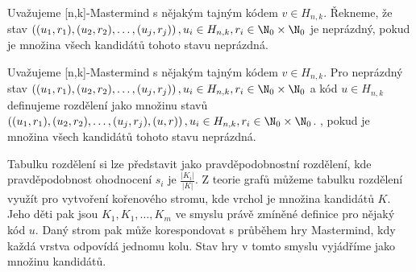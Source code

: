 \begin{definice}
    Uvažujeme [n,k]-Mastermind s nějakým tajným kódem $v\in H_{n,k}$. Řekneme, že stav $\left((u_1, r_1), (u_2,r_2), \dots, (u_j,r_j)\right), u_i \in H_{n,k}, r_i \in \N _0 \times \N _0$ je neprázdný, pokud je množina všech kandidátů tohoto stavu neprázdná. 
\end{definice}

\begin{definice}[Rozdělení]
    Uvažujeme [n,k]-Mastermind s nějakým tajným kódem $v\in H_{n,k}$. Pro neprázdný stav $\left((u_1, r_1), (u_2,r_2), \dots, (u_j,r_j)\right), u_i \in H_{n,k}, r_i \in \N _0 \times \N _0$ a kód $u \in H_{n,k}$ definujeme rozdělení jako množinu stavů $\left((u_1, r_1), (u_2,r_2), \dots, (u_j,r_j), (u, r)\right), u_i \in H_{n,k}, r_i \in \N _0 \times \N _0$. , pokud je množina všech kandidátů tohoto stavu neprázdná. 
\end{definice}

Tabulku rozdělení si lze představit jako pravděpodobnostní rozdělení, kde pravděpodobnost ohodnocení $s_i$ je $\frac{|K_i|}{|K|}$. Z teorie grafů můžeme tabulku rozdělení využít pro vytvoření kořenového stromu, kde vrchol je množina kandidátů $K$. Jeho děti pak jsou $K_1, K_1, \dots, K_m$ ve smyslu právě zmíněné definice pro nějaký kód $u$. Daný strom pak může korespondovat s průběhem hry Mastermind, kdy každá vrstva odpovídá jednomu kolu. Stav hry v tomto smyslu vyjádříme jako množinu kandidátů. 


